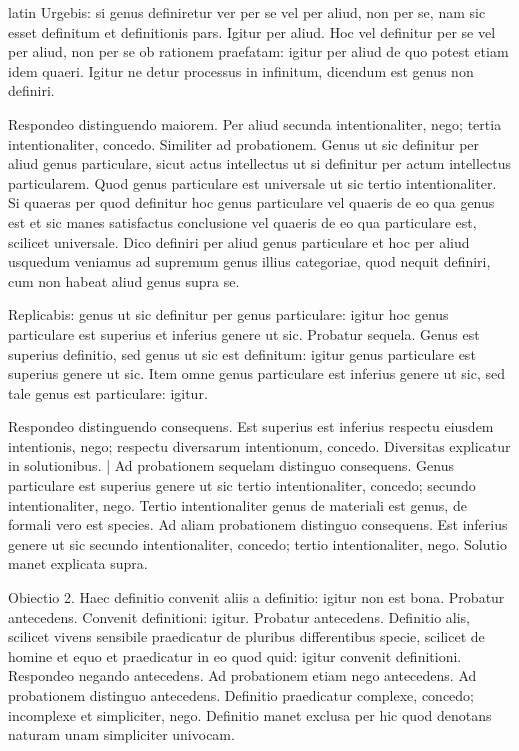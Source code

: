 \begin{otherlanguage*}{latin}
\pstart
Urgebis:
si genus definiretur ver per se vel per aliud, non per se, nam sic esset definitum et definitionis pars. Igitur per aliud. Hoc vel definitur per se vel per aliud, non per se ob rationem praefatam:
igitur per aliud de quo potest etiam idem quaeri. Igitur ne detur processus in infinitum, dicendum est genus non definiri. 
\pend

\pstart
Respondeo distinguendo maiorem. Per aliud secunda intentionaliter, nego; tertia intentionaliter, concedo. Similiter ad probationem. Genus ut sic definitur per aliud genus particulare, sicut actus intellectus ut si definitur per actum intellectus particularem. Quod genus particulare est universale ut sic tertio intentionaliter. Si quaeras per quod definitur hoc genus particulare vel quaeris de eo qua genus est et sic manes satisfactus conclusione vel quaeris de eo qua particulare est, scilicet universale. Dico definiri per aliud genus particulare et hoc per aliud usquedum veniamus ad supremum genus illius categoriae, quod nequit definiri, cum non habeat aliud genus supra se. 
\pend

\pstart
Replicabis:
genus ut sic definitur per genus particulare:
igitur hoc genus particulare est superius et inferius genere ut sic. Probatur sequela. Genus est superius definitio, sed genus ut sic est definitum:
igitur genus particulare est superius genere ut sic. Item omne genus particulare est inferius genere ut sic, sed tale genus est particulare:
igitur. 
\pend

\pstart
Respondeo distinguendo consequens. Est superius est inferius respectu eiusdem intentionis, nego; respectu diversarum intentionum, concedo. Diversitas explicatur in solutionibus. \textnormal{|} Ad probationem sequelam distinguo consequens. Genus particulare est superius genere ut sic tertio intentionaliter, concedo; secundo intentionaliter, nego. Tertio intentionaliter genus de materiali est genus, de formali vero est species. Ad aliam probationem distinguo consequens. Est inferius genere ut sic secundo intentionaliter, concedo; tertio intentionaliter, nego. Solutio manet explicata supra. 
\pend

\pstart
Obiectio 2. Haec definitio convenit aliis a definitio:
igitur non est bona. Probatur antecedens. Convenit definitioni:
igitur. Probatur antecedens. Definitio alis, scilicet vivens sensibile praedicatur de pluribus differentibus specie, scilicet de homine et equo et praedicatur in eo quod quid:
igitur convenit definitioni. Respondeo negando antecedens. Ad probationem etiam nego antecedens. Ad probationem distinguo antecedens. Definitio praedicatur complexe, concedo; incomplexe et simpliciter, nego. Definitio manet exclusa per hic quod denotans naturam unam simpliciter univocam. 
\pend


\end{otherlanguage*}
